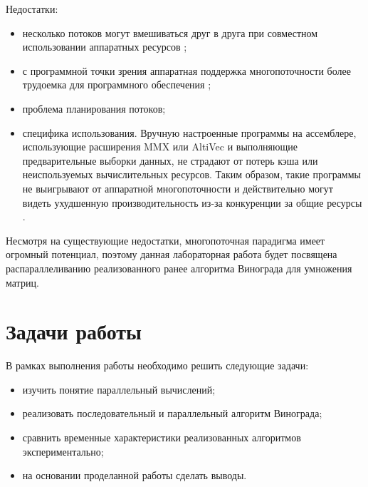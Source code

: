 Недостатки:
\begin{itemize}
	\item несколько потоков могут вмешиваться друг в друга при совместном использовании аппаратных ресурсов \cite{Nemirovsky};
	\item с программной точки зрения аппаратная поддержка многопоточности более трудоемка для программного обеспечения \cite{Olukotun};
	\item проблема планирования потоков;
	\item специфика использования. Вручную настроенные программы на ассемблере, использующие расширения MMX или AltiVec и выполняющие предварительные выборки данных, не страдают от потерь кэша или неиспользуемых вычислительных ресурсов. Таким образом, такие программы не выигрывают от аппаратной многопоточности и действительно могут видеть ухудшенную производительность из-за конкуренции за общие ресурсы \cite{intel}.
\end{itemize}
Несмотря на существующие недостатки, многопоточная парадигма имеет огромный потенциал, поэтому данная лабораторная работа будет посвящена распараллеливанию реализованного ранее алгоритма Винограда для умножения матриц.\\

\section*{Задачи работы}

В рамках выполнения работы необходимо решить следующие задачи:
\begin{itemize}
	\item изучить понятие параллельный вычислений;
	\item реализовать последовательный и параллельный алгоритм Винограда;
	\item сравнить временные характеристики реализованных алгоритмов экспериментально;
	\item на основании проделанной работы сделать выводы.
\end{itemize}

